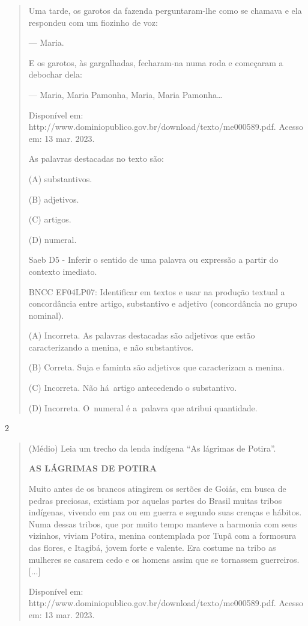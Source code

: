 \begin{itemize}
{{{\begin{itemize}
\begin{itemize}
\begin{itemize}
\begin{quote}
Uma tarde, os garotos da fazenda perguntaram-lhe como se chamava e ela
respondeu com um fiozinho de voz:

--- Maria.

E os garotos, às gargalhadas, fecharam-na numa roda e começaram a
debochar dela:

--- Maria, Maria Pamonha, Maria, Maria Pamonha\ldots{}

Disponível em:
http://www.dominiopublico.gov.br/download/texto/me000589.pdf. Acesso em:
13 mar. 2023.

As palavras destacadas no texto são:

(A) substantivos.

(B) adjetivos.

(C) artigos.

(D) numeral.

Saeb D5 - Inferir o sentido de uma palavra ou expressão a partir do
contexto imediato.

BNCC EF04LP07: Identificar em textos e usar na produção textual a
concordância entre artigo, substantivo e adjetivo (concordância no grupo
nominal).

(A) Incorreta. As palavras destacadas são adjetivos que estão
caracterizando a menina, e não substantivos.

(B) Correta. Suja e faminta são adjetivos que caracterizam a menina.

(C) Incorreta. Não há~artigo antecedendo o substantivo.

(D) Incorreta. O~numeral é a~palavra que atribui quantidade.
\end{quote}

\num{2}

\begin{quote}
(Médio) Leia um trecho da lenda indígena ``As lágrimas de Potira''.

\textbf{AS LÁGRIMAS DE POTIRA}

Muito antes de os brancos atingirem os sertões de Goiás, em busca de
pedras preciosas, existiam por aquelas partes do Brasil muitas tribos
indígenas, vivendo em paz ou em guerra e segundo suas crenças e hábitos.
Numa dessas tribos, que por muito tempo manteve a harmonia com seus
vizinhos, viviam Potira, menina contemplada por Tupã com a formosura das
flores, e Itagibá, jovem forte e valente. Era costume na tribo as
mulheres se casarem cedo e os homens assim que se tornassem guerreiros.
{[}...{]}

Disponível em:
http://www.dominiopublico.gov.br/download/texto/me000589.pdf. Acesso em:
13 mar. 2023.


\end{quote}
\end{itemize}
\end{itemize}
\end{itemize}}}}
\end{itemize}
